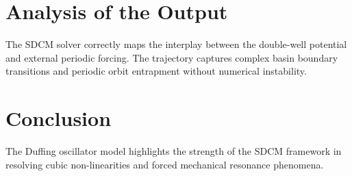 \section{Analysis of the Output}
The SDCM solver correctly maps the interplay between the double-well potential and external periodic forcing. The trajectory captures complex basin boundary transitions and periodic orbit entrapment without numerical instability.

\section{Conclusion}
The Duffing oscillator model highlights the strength of the SDCM framework in resolving cubic non-linearities and forced mechanical resonance phenomena.
